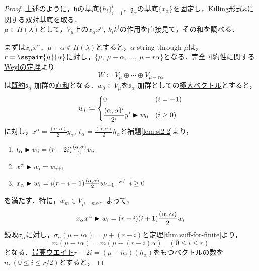 \documentclass[rep_main]{subfiles}
\begin{document}
\begin{proof}
	上述のように，$\mathfrak{h}$の基底$\{h_i\}_{i=1}^l$，$\mathfrak{g}_\alpha$の基底$\{x_\alpha\}$を固定し，\hyperref[def:Killing-form]{Killing形式}$\kappa$に関する\hyperref[lem:Casimir]{双対基底}を取る．\\
	$\mu \in \Pi(\lambda)$として，$V_\mu$上の$x_\alpha x^\alpha,\ k_ik^i$の作用を直接見て，その和を調べる．
	
	まずは$x_\alpha x^\alpha$．$\mu + \alpha \notin \Pi(\lambda)$とすると，$\alpha$-string through $\mu$は，$r = \sspair{\mu}{\alpha}$に対し，$\{\mu,\ \mu - \alpha,\ \ldots,\ \mu - r\alpha\}$となる．\hyperref[thm:Weyl]{完全可約性に関するWeylの定理}より
	\begin{equation}
		W \coloneqq V_\mu \oplus \cdots \oplus V_{\mu - r\alpha}
	\end{equation}
	は\hyperref[def:irr]{既約}$\mathfrak{s}_\alpha$-加群の\hyperref[def:gmod-directsum]{直和}となる．$w_0 \in V_\mu$を$\mathfrak{s}_\alpha$-加群としての\hyperref[def:maximal-vector-rep]{極大ベクトル}とすると，
	\begin{equation}
		w_i \coloneqq \left\{\begin{aligned}
			 &0 &&(i = -1) \\
			 &\frac{(\alpha, \alpha)^i}{2^i}y^i \blacktriangleright w_0  &&(i \geq 0)
		\end{aligned} \right.
	\end{equation}
	に対し，$x^\alpha = \frac{(\alpha, \alpha)}{2}y_\alpha,\ t_\alpha = \frac{(\alpha, \alpha)}{2}h_\alpha$と補題\ref{lem:sl2-2}より，
	\begin{enumerate}
		\item $t_\alpha \blacktriangleright w_i = (r - 2i)\frac{(\alpha, \alpha)}{2}w_i$
		\item $x^\alpha \blacktriangleright w_i = w_{i+1}$
		\item $x_\alpha \blacktriangleright w_i = i(r - i+1)\frac{(\alpha, \alpha)}{2}w_{i-1}  \mathrel{} {}^{\mathrm{w}/} \mathrel{} i \ge 0$
	\end{enumerate}
	を満たす．特に，$w_m \in V_{\mu - m\alpha}$．よって，
	\begin{equation}
		\label{eq:Freudenthal-proof-1}
		x_\alpha x^\alpha \blacktriangleright w_i = (r - i)(i + 1)\frac{(\alpha, \alpha)}{2}w_i
	\end{equation}
	鏡映$\sigma_\alpha$に対し，$\sigma_\alpha(\mu - i\alpha) = \mu + (r - i)$と定理\ref{thm:suff-for-finite}より，
	\begin{equation}
		m(\mu - i\alpha) = m(\mu - (r - i)\alpha)\quad  (0 \leq i \leq r)
	\end{equation}
	となる．\hyperref[def:highest-weight-module]{最高ウエイト}$r - 2i = (\mu - i\alpha)(h_\alpha)$をもつベクトルの数を$n_i\ (0 \leq i \leq r/2)$とすると，

\end{proof}
\end{document}

